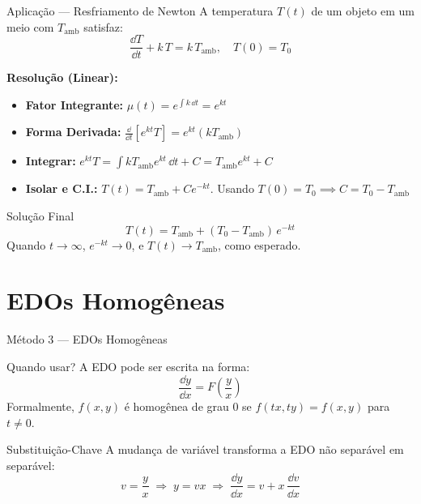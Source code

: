 \documentclass[11pt, aspectratio=169, xcolor=table]{beamer}
\begin{document}
\begin{frame}{Aplicação --- Resfriamento de Newton}
A temperatura $T(t)$ de um objeto em um meio com $T_{\text{amb}}$ satisfaz:
\[
\frac{\dd T}{\dd t} + k\,T = k\,T_{\text{amb}},\quad T(0)=T_0
\]

\textbf{Resolução (Linear):}
\begin{itemize}
  \item \textbf{Fator Integrante:} $\mu(t) = e^{\int k\,\dd t} = e^{kt}$
  \item \textbf{Forma Derivada:} $\displaystyle \frac{\dd}{\dd t}\left[ e^{kt}T \right] = e^{kt}(k T_{\text{amb}})$
  \item \textbf{Integrar:} $e^{kt}T = \int kT_{\text{amb}}e^{kt}\,\dd t + C = T_{\text{amb}}e^{kt} + C$
  \item \textbf{Isolar e C.I.:} $T(t) = T_{\text{amb}} + Ce^{-kt}$. Usando $T(0)=T_0 \implies C = T_0 - T_{\text{amb}}$
\end{itemize}
\end{frame}

\begin{frame}
\begin{alertblock}{Solução Final}
\[
T(t) = T_{\text{amb}} + (T_0 - T_{\text{amb}})\,e^{-kt}
\]
Quando $t\to\infty$, $e^{-kt}\to 0$, e $T(t)\to T_{\text{amb}}$, como esperado.
\end{alertblock}
\end{frame}

\section{EDOs Homogêneas}

\begin{frame}{Método 3 --- EDOs Homogêneas}
\begin{block}{Quando usar?}
A EDO pode ser escrita na forma:
\[
\frac{\dd y}{\dd x} = F\!\left(\frac{y}{x}\right)
\]
Formalmente, $f(x,y)$ é homogênea de grau 0 se \(f(tx,ty)=f(x,y)\) para \(t\neq 0\).
\end{block}

\begin{alertblock}{Substituição-Chave}
A mudança de variável transforma a EDO não separável em separável:
\[
v=\frac{y}{x}\;\Longrightarrow\; y=vx \;\Longrightarrow\; \frac{\dd y}{\dd x} = v + x\,\frac{\dd v}{\dd x}
\]
\end{alertblock}
\end{frame}
\end{document}
